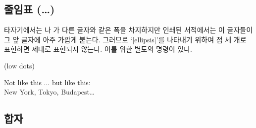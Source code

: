 \subsection{줄임표 (\texorpdfstring{\ldots}{...})}

타자기에서는 나 가 다른 글자와 같은 폭을 차지하지만
인쇄된 서적에서는 이 글자들이 그 앞 글자에 아주 가깝게 붙는다. 그러므로 `[ellipsis]'를 
나타내기 위하여 점 세 개로 표현하면 제대로 표현되지 않는다. 이를 위한 별도의
명령이 있다.




\begin{lscommand}
 (low dots)
\end{lscommand}

\begin{example}
Not like this ... but like this:\\
New York, Tokyo, Budapest\ldots
\end{example}

\subsection{합자}

